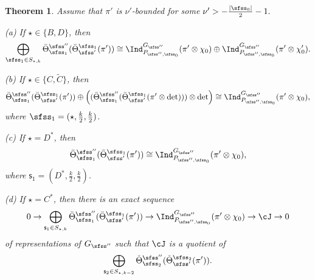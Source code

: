 \documentclass[11pt,a4paper]{amsart}
\def\abs#1{\left|{#1}\right|}
\numberwithin{equation}{section}
\newtheorem{thm}{Theorem}[section]
\theoremstyle{remark}
\def\Thetab{\bar{\Theta}}
\begin{document}
\begin{thm}\label{doubtt}
Assume that $\pi'$  is $\nu'$-bounded for some
$
  \nu'>
 -\frac{\abs{\sfss_0}}{2}-1.
$

\noindent
(a) If $\star\in \{B,D\}$,  then
\[
    \bigoplus_{\sfss_1\in S_{\star, k}}   \Thetab^{\sfss''}_{\sfss_1}(\Thetab^{\sfss_1}_{\sfss'}(\pi'))\cong \Ind_{P_{\sfss'',\sfss_0}}^{G_{\sfss''}} (\pi'\otimes \chi_0)
    \oplus  \Ind_{P_{\sfss'',\sfss_0}}^{G_{\sfss''}} (\pi' \otimes \chi'_0).
    \]

  \smallskip



    \noindent
(b) If $\star\in \{C,\widetilde C\}$, then
\[
 \Thetab^{\sfss''}_{\sfss_1}(\Thetab^{\sfss_1}_{\sfss'}(\pi'))\oplus\left(  (\Thetab^{\sfss''}_{\sfss_1}(\Thetab^{\sfss_1}_{\sfss'}(\pi'\otimes \det)))\otimes \det \right)\cong \Ind_{P_{\sfss'',\sfss_0}}^{G_{\sfss''}} (\pi'\otimes \chi_0),
\]
where $\sfss_1=(\star, \frac{k}{2},\frac{k}{2})$.
  \smallskip

\noindent
(c) If $\star=D^*$, then
\[
 \Thetab^{\sfss''}_{\sfss_1}(\Thetab^{\sfss_1}_{\sfss'}(\pi'))\cong \Ind_{P_{\sfss'',\sfss_0}}^{G_{\sfss''}} (\pi'\otimes \chi_0),
 \]
where $ \mathsf s_1=(D^*, \frac{k}{2}, \frac{k}{2})$.


\smallskip

\noindent
(d) If $\star=C^*$, then there is an exact sequence
\[
 0\rightarrow   \bigoplus_{\mathsf s_1\in S_{\star, k}}  \Thetab^{\sfss''}_{\sfss_1}(\Thetab^{\sfss_1}_{\sfss'}(\pi'))\rightarrow \Ind_{P_{\sfss'',\sfss_0}}^{G_{\sfss''}} (\pi'\otimes \chi_0)\rightarrow \cJ\rightarrow 0
\]
 of representations of $G_{\sfss''}$ such that $\cJ$ is a quotient of
\[
\bigoplus_{\mathsf s_2\in S_{\star, k-2}} \check \Theta^{\sfss''}_{\sfss_2}(\check \Theta^{\sfss_2}_{\sfss'}(\pi')).
\]
\end{thm}
\end{document}
